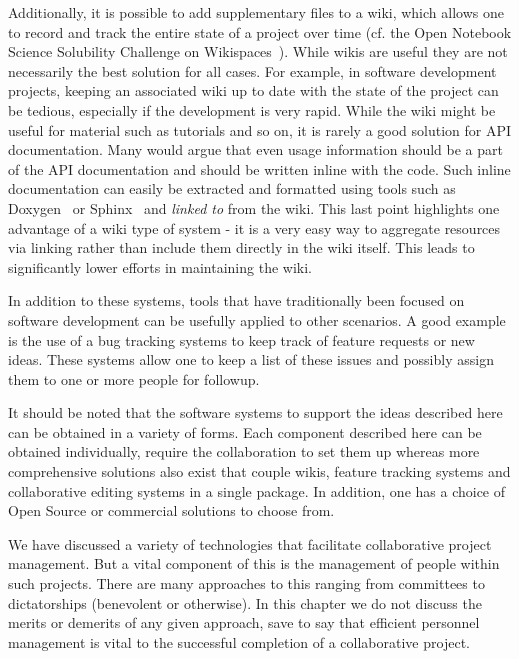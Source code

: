 \documentclass[11pt]{book}
\begin{document}
Additionally, it is possible to add supplementary files to a wiki,
which allows one to record and track the entire state of a project
over time (cf. the Open Notebook Science Solubility Challenge on
Wikispaces~\cite{ons:exp34}). While wikis are useful they are not necessarily the
best solution for all cases. For example, in software development
projects, keeping an associated wiki up to date with the state of the
project can be tedious, especially if the development is very
rapid. While the wiki might be useful for material such as tutorials
and so on, it is rarely a good solution for API documentation. Many
would argue that even usage information should be a part of the API
documentation and should be written inline with the code. Such inline
documentation can easily be extracted and formatted using tools such
as Doxygen~\cite{url:doxygen} or Sphinx~\cite{url:sphinx}
and \emph{linked to} from the wiki. This last
point highlights one advantage of a wiki type of system - it is a very
easy way to aggregate resources via linking rather than include them
directly in the wiki itself. This leads to significantly lower efforts
in maintaining the wiki.

In addition to these systems, tools that have traditionally been
focused on software development can be usefully applied to other
scenarios. A good example is the use of a bug tracking systems to keep
track of feature requests or new ideas. These systems allow one to
keep a list of these issues and possibly assign them to one or more
people for followup.

It should be noted that the software systems to support the ideas
described here can be obtained in a variety of forms. Each component
described here can be obtained individually, require the collaboration
to set them up whereas more comprehensive solutions also exist that
couple wikis, feature tracking systems and collaborative editing
systems in a single package. In addition, one has a choice of Open
Source or commercial solutions to choose from.

We have discussed a variety of technologies that facilitate
collaborative project management. But a vital component of this is the
management of people within such projects. There are many approaches to
this ranging from committees to dictatorships (benevolent or
otherwise). In this chapter we do not discuss the merits or demerits
of any given approach, save to say that efficient personnel management
is vital to the successful completion of a collaborative project.
\end{document}
